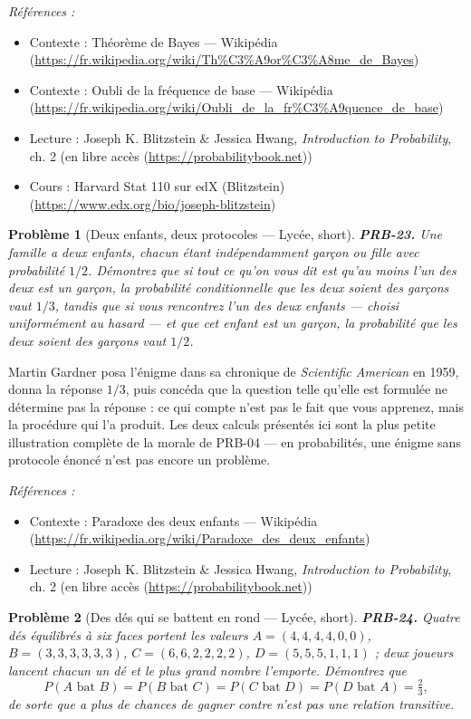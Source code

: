 \documentclass[11pt]{article}
\newtheorem{problem}{Problème}
\newenvironment{refs}{\par\small\noindent\emph{Références :}\begin{itemize}\setlength\itemsep{0pt}}{\end{itemize}\normalsize}
\begin{document}
\begin{refs}
\item Contexte : Théorème de Bayes --- Wikipédia (\url{https://fr.wikipedia.org/wiki/Th%C3%A9or%C3%A8me_de_Bayes})
\item Contexte : Oubli de la fréquence de base --- Wikipédia (\url{https://fr.wikipedia.org/wiki/Oubli_de_la_fr%C3%A9quence_de_base})
\item Lecture : Joseph K. Blitzstein \& Jessica Hwang, \textit{Introduction to Probability}, ch. 2 (en libre accès (\url{https://probabilitybook.net}))
\item Cours : Harvard Stat 110 sur edX (Blitzstein) (\url{https://www.edx.org/bio/joseph-blitzstein})
\end{refs}

\bigskip

\begin{problem}[{Deux enfants, deux protocoles --- Lycée, short}]
\textbf{PRB-23.} Une famille a deux enfants, chacun étant indépendamment
garçon ou fille avec probabilité $ 1/2 $. Démontrez que si tout ce qu'on vous dit est qu'au moins
l'un des deux est un garçon, la probabilité conditionnelle que les deux soient des garçons vaut
$ 1/3 $, tandis que si vous rencontrez l'un des deux enfants --- choisi uniformément au hasard --- et
que cet enfant est un garçon, la probabilité que les deux soient des garçons vaut $ 1/2 $.
\end{problem}

\noindent Martin Gardner posa l'énigme dans sa chronique de \textit{Scientific American} en
1959, donna la réponse $ 1/3 $, puis concéda que la question telle qu'elle est formulée ne
détermine pas la réponse : ce qui compte n'est pas le fait que vous apprenez, mais la procédure
qui l'a produit. Les deux calculs présentés ici sont la plus petite illustration complète de la
morale de PRB-04 --- en probabilités, une énigme sans protocole énoncé n'est pas encore un
problème.

\begin{refs}
\item Contexte : Paradoxe des deux enfants --- Wikipédia (\url{https://fr.wikipedia.org/wiki/Paradoxe_des_deux_enfants})
\item Lecture : Joseph K. Blitzstein \& Jessica Hwang, \textit{Introduction to Probability}, ch. 2 (en libre accès (\url{https://probabilitybook.net}))
\end{refs}

\bigskip

\begin{problem}[{Des dés qui se battent en rond --- Lycée, short}]
\textbf{PRB-24.} Quatre dés équilibrés à six faces portent les valeurs
$ A = (4,4,4,4,0,0) $, $ B = (3,3,3,3,3,3) $, $ C = (6,6,2,2,2,2) $,
$ D = (5,5,5,1,1,1) $ ; deux joueurs lancent chacun un dé et le plus grand nombre l'emporte.
Démontrez que
\[ P(A \text{ bat } B) = P(B \text{ bat } C) = P(C \text{ bat } D)
 = P(D \text{ bat } A) = \tfrac{2}{3}, \]
de sorte que \og{} a plus de chances de gagner contre \fg{} n'est pas une relation transitive.
\end{problem}
\end{document}
